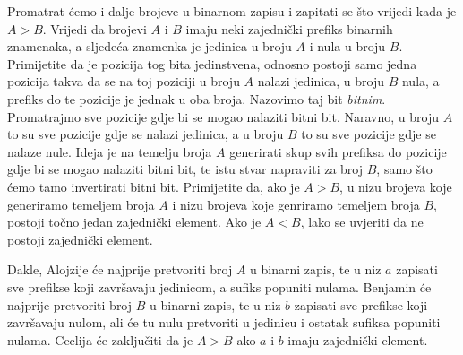 Promatrat ćemo i dalje brojeve u binarnom zapisu i zapitati se što vrijedi kada
je $A > B$. Vrijedi da brojevi $A$ i $B$ imaju neki zajednički prefiks binarnih
znamenaka, a sljedeća znamenka je jedinica u broju $A$ i nula u broju $B$.
Primijetite da je pozicija tog bita jedinstvena, odnosno postoji samo jedna
pozicija takva da se na toj poziciji u broju $A$ nalazi jedinica, u broju $B$
nula, a prefiks do te pozicije je jednak u oba broja. Nazovimo taj bit
\textit{bitnim}. Promatrajmo sve pozicije gdje bi se mogao nalaziti bitni bit.
Naravno, u broju $A$ to su sve pozicije gdje se nalazi jedinica, a u broju $B$
to su sve pozicije gdje se nalaze nule. Ideja je na temelju broja $A$ generirati
skup svih prefiksa do pozicije gdje bi se mogao nalaziti bitni bit, te istu stvar
napraviti za broj $B$, samo što ćemo tamo invertirati bitni bit. Primijetite da,
ako je $A > B$, u nizu brojeva koje generiramo temeljem broja $A$ i nizu brojeva
koje genriramo temeljem broja $B$, postoji točno jedan zajednički element. Ako je
$A < B$, lako se uvjeriti da ne postoji zajednički element.

Dakle, Alojzije će najprije pretvoriti broj $A$ u binarni zapis, te u niz $a$
zapisati sve prefikse koji završavaju jedinicom, a sufiks popuniti nulama.
Benjamin će najprije pretvoriti broj $B$ u binarni zapis, te u niz $b$ zapisati
sve prefikse koji završavaju nulom, ali će tu nulu pretvoriti u jedinicu i ostatak
sufiksa popuniti nulama. Ceclija će zaključiti da je $A > B$ ako $a$ i $b$
imaju zajednički element.
